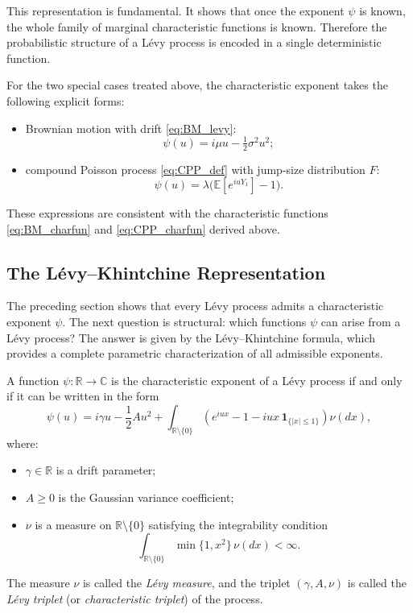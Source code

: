 This representation is fundamental. It shows that once the exponent $\psi$ is known, the whole family of marginal characteristic functions is known. Therefore the probabilistic structure of a L\'evy process is encoded in a single deterministic function.

\medskip

\begin{remark}
For the two special cases treated above, the characteristic exponent takes the following explicit forms:
\begin{itemize}[label = --]
    \item Brownian motion with drift \eqref{eq:BM_levy}:
    \[
    \psi(u) = i\mu u - \tfrac{1}{2}\sigma^2 u^2;
    \]
    \item compound Poisson process \eqref{eq:CPP_def} with jump-size distribution $F$:
    \[
    \psi(u) = \lambda\bigl(\mathbb{E}[e^{iuY_1}]-1\bigr).
    \]
\end{itemize}
These expressions are consistent with the characteristic functions \eqref{eq:BM_charfun} and \eqref{eq:CPP_charfun} derived above.
\end{remark}
\subsection{The L\'evy--Khintchine Representation}


The preceding section shows that every L\'evy process admits a characteristic exponent $\psi$. The next question is structural: which functions $\psi$ can arise from a L\'evy process? The answer is given by the L\'evy--Khintchine formula, which provides a complete parametric characterization of all admissible exponents.

\begin{theorem}
A function $\psi:\mathbb{R}\to\mathbb{C}$ is the characteristic exponent of a L\'evy process if and only if it can be written in the form
\begin{equation}\label{eq:LevyKhintchine}
\psi(u)
=
i\gamma u
-\frac{1}{2}Au^2
+
\int_{\mathbb{R}\setminus\{0\}}
\left(
e^{iux}-1-iux\,\mathbf{1}_{\{|x|\leq 1\}}
\right)\nu(dx),
\end{equation}
where:
\begin{itemize}[label = --]
    \item $\gamma\in\mathbb{R}$ is a drift parameter;
    \item $A\geq 0$ is the Gaussian variance coefficient;
    \item $\nu$ is a measure on $\mathbb{R}\setminus\{0\}$ satisfying the integrability condition
    \begin{equation}\label{eq:levy_measure_cond}
    \int_{\mathbb{R}\setminus\{0\}}\min\{1,x^2\}\,\nu(dx)<\infty.
    \end{equation}
\end{itemize}
The measure $\nu$ is called the \emph{L\'evy measure}, and the triplet $(\gamma,A,\nu)$ is called the \emph{L\'evy triplet} (or \emph{characteristic triplet}) of the process.
\end{theorem}

